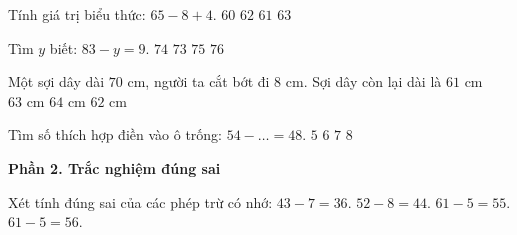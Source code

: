 \begin{ex} %
Tính giá trị biểu thức: $65 - 8 + 4$.
\choice
{$60$}
{$62$}
{\True $61$}
{$63$}
\end{ex}

\begin{ex} %
Tìm $y$ biết: $83 - y = 9$.
\choice
{\True $74$}
{$73$}
{$75$}
{$76$}
\end{ex}

\begin{ex} %
Một sợi dây dài $70\text{ cm}$, người ta cắt bớt đi $8\text{ cm}$. Sợi dây còn lại dài là
\choice
{$61\text{ cm}$}
{$63\text{ cm}$}
{$64\text{ cm}$}
{\True $62\text{ cm}$}
\end{ex}

\begin{ex} %
Tìm số thích hợp điền vào ô trống: $54 - \dots = 48$.
\choice
{$5$}
{\True $6$}
{$7$}
{$8$}
\end{ex}

\textbf{Phần 2. Trắc nghiệm đúng sai}

\begin{ex} %
Xét tính đúng sai của các phép trừ có nhớ:
\choiceTF
{\True $43 - 7 = 36$.}
{\True $52 - 8 = 44$.}
{$61 - 5 = 55$.}
{\True $61 - 5 = 56$.}
\end{ex}

